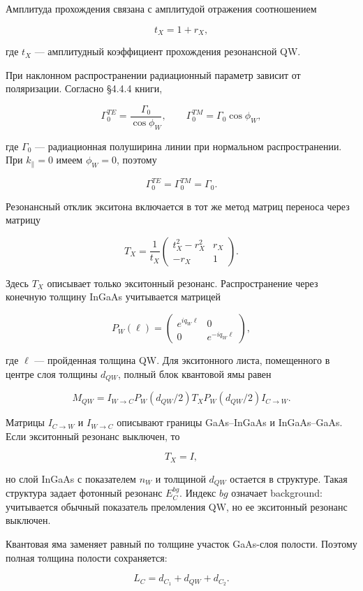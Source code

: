 \documentclass[12pt,a4paper]{article}
\begin{document}
Амплитуда прохождения связана с амплитудой отражения соотношением

\[
t_X=1+r_X,
\]

где $t_X$ --- амплитудный коэффициент прохождения резонансной QW.

При наклонном распространении радиационный параметр зависит от поляризации. Согласно \S4.4.4 книги,

\[
\Gamma_0^{TE}
=
\frac{\Gamma_0}{\cos\phi_W},
\qquad
\Gamma_0^{TM}
=
\Gamma_0\cos\phi_W,
\]

где $\Gamma_0$ --- радиационная полуширина линии при нормальном распространении. При $k_\parallel=0$ имеем $\phi_W=0$, поэтому

\[
\Gamma_0^{TE}=\Gamma_0^{TM}=\Gamma_0.
\]

Резонансный отклик экситона включается в тот же метод матриц переноса через матрицу

\[
T_X
=
\frac{1}{t_X}
\begin{pmatrix}
t_X^2-r_X^2 & r_X\\
-r_X & 1
\end{pmatrix}.
\]

Здесь $T_X$ описывает только экситонный резонанс. Распространение через конечную толщину InGaAs учитывается матрицей

\[
P_W(\ell)
=
\begin{pmatrix}
e^{iq_W\ell} & 0\\
0 & e^{-iq_W\ell}
\end{pmatrix},
\]

где $\ell$ --- пройденная толщина QW. Для экситонного листа, помещенного в центре слоя толщины $d_{QW}$, полный блок квантовой ямы равен

\[
M_{QW}
=
I_{W\rightarrow C}
P_W(d_{QW}/2)
T_X
P_W(d_{QW}/2)
I_{C\rightarrow W}.
\]

Матрицы $I_{C\rightarrow W}$ и $I_{W\rightarrow C}$ описывают границы GaAs--InGaAs и InGaAs--GaAs. Если экситонный резонанс выключен, то

\[
T_X=I,
\]

но слой InGaAs с показателем $n_W$ и толщиной $d_{QW}$ остается в структуре. Такая структура задает фотонный резонанс $E_C^{bg}$. Индекс $bg$ означает background: учитывается обычный показатель преломления QW, но ее экситонный резонанс выключен.

Квантовая яма заменяет равный по толщине участок GaAs-слоя полости. Поэтому полная толщина полости сохраняется:

\[
L_C=d_{C_1}+d_{QW}+d_{C_2}.
\]
\end{document}
